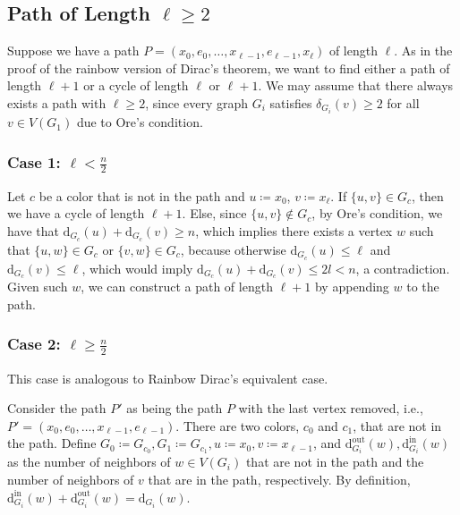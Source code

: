 \subsection{Path of Length $\ell \geq 2$}

Suppose we have a path $ P = (x_0, e_0, \dots, x_{\ell-1}, e_{\ell-1}, x_{\ell}) $ of length $ \ell $.
As in the proof of the rainbow version of Dirac's theorem,
we want to find either a path of length $ \ell+1 $ or a cycle of length $ \ell $ or $ \ell+1 $.
We may assume that there always exists a path with $ \ell \geq 2 $, since every graph 
$ G_i $ satisfies $ \delta_{G_i}(v) \geq 2 $ for all $ v \in V(G_1) $ due to Ore's condition.

\subsubsection{Case 1: \( \ell < \frac{n}{2} \)}

Let \( c \) be a color that is not in the path and \(u \coloneqq x_0\), \(v \coloneqq x_{\ell}\). 
If \( \{u, v\} \in G_c \), then we have a cycle of length \( \ell+1 \).
Else, since \( \{u, v\} \not\in G_c \), by Ore's condition, 
we have that \( \text{d}_{G_c}(u) + \text{d}_{G_c}(v) \geq n \), which implies there exists a 
vertex \( w \) such that \( \{u, w\} \in G_c \) or \( \{v, w\} \in G_c \), because otherwise
\( \text{d}_{G_c}(u) \leq \ell  \) and \( \text{d}_{G_c}(v) \leq \ell \), 
which would imply \( \text{d}_{G_c}(u) + \text{d}_{G_c}(v) \leq 2l < n \), a contradiction.
Given such \(w\), we can construct a path of length \( \ell+1 \) by appending \(w\) to the path.

\subsubsection{Case 2: \( \ell \geq \frac{n}{2} \)}

This case is analogous to Rainbow Dirac's equivalent case.

Consider the path $P'$ as being the path $P$ with the last vertex removed, i.e., $P' = (x_0, e_0, \dots, x_{\ell-1}, e_{\ell-1})$.
There are two colors, $c_0$ and $c_1$, that are not in the path. Define 
\(G_0 \coloneqq G_{c_0}, G_1 \coloneqq G_{c_1}, u \coloneqq x_0, v \coloneqq x_{\ell-1}\), and 
\( \text{d}^{\text{out}}_{G_i}(w), \text{d}^{\text{in}}_{G_i}(w) \) as the number of neighbors of \(w \in V(G_i)\) that are not in the path
and the number of neighbors of \(v\) that are in the path, respectively.
By definition, \( \text{d}^{\text{in}}_{G_i}(w) +  \text{d}^{\text{out}}_{G_i}(w) = \text{d}_{G_i}(w) \).

